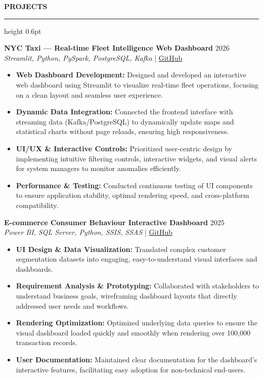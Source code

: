 ﻿\documentclass{resume}
\renewcommand{\sectionskip}{\vspace{5pt}}
\renewcommand{\sectionlineskip}{\vspace{3pt}}
\renewenvironment{rSection}[1]{
  \sectionskip
  {\color{headerblue}\textbf{\MakeUppercase{#1}}}
  \sectionlineskip
  {\color{rulegray}\hrule height 0.6pt}
  \vspace{0pt}
  \begin{list}{}{
    \setlength{\leftmargin}{0em}
    \setlength{\topsep}{0pt}
    \setlength{\partopsep}{0pt}
    \setlength{\parsep}{0pt}
    \setlength{\itemsep}{0pt}
  }
  \item[]
}{
  \end{list}
}
\begin{document}
\begin{rSection}{Projects}
    \item \textbf{NYC Taxi — Real-time Fleet Intelligence Web Dashboard} \hfill 2026\\
    {\small \textit{Streamlit, Python, PySpark, PostgreSQL, Kafka}} \hfill | \href{https://github.com/vietpham10205/real-time-Fleet-Intelligence-anomaly-detection-dashboard}{GitHub}
    {\small
    \begin{itemize}[itemsep=4pt, parsep=0pt, leftmargin=1.2em]
        \item \textbf{Web Dashboard Development:} Designed and developed an interactive web dashboard using Streamlit to visualize real-time fleet operations, focusing on a clean layout and seamless user experience.
        \item \textbf{Dynamic Data Integration:} Connected the frontend interface with streaming data (Kafka/PostgreSQL) to dynamically update maps and statistical charts without page reloads, ensuring high responsiveness.
        \item \textbf{UI/UX \& Interactive Controls:} Prioritized user-centric design by implementing intuitive filtering controls, interactive widgets, and visual alerts for system managers to monitor anomalies efficiently.
        \item \textbf{Performance \& Testing:} Conducted continuous testing of UI components to ensure application stability, optimal rendering speed, and cross-platform compatibility.
    \end{itemize}
    }
    \vspace{15pt}

    \item \textbf{E-commerce Consumer Behaviour Interactive Dashboard} \hfill 2025\\
    {\small \textit{Power BI, SQL Server, Python, SSIS, SSAS}} \hfill | \href{https://github.com/vietpham10205/Datawarehouse-Olap_Project-E-commerce-Consumer-Behavior-Analysis-BI-Solution}{GitHub}
    {\small
    \begin{itemize}[itemsep=4pt, parsep=0pt, leftmargin=1.2em]
        \item \textbf{UI Design \& Data Visualization:} Translated complex customer segmentation datasets into engaging, easy-to-understand visual interfaces and dashboards.
        \item \textbf{Requirement Analysis \& Prototyping:} Collaborated with stakeholders to understand business goals, wireframing dashboard layouts that directly addressed user needs and workflows.
        \item \textbf{Rendering Optimization:} Optimized underlying data queries to ensure the visual dashboard loaded quickly and smoothly when rendering over 100,000 transaction records.
        \item \textbf{User Documentation:} Maintained clear documentation for the dashboard's interactive features, facilitating easy adoption for non-technical end-users.
    \end{itemize}
    }
\end{rSection}
\end{document}
